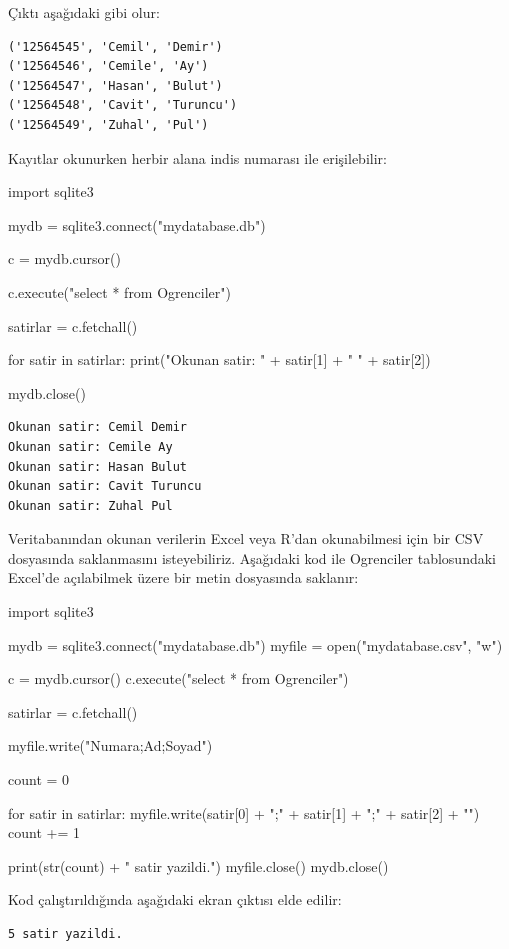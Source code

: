 \documentclass[12pt]{report}
\begin{document}
Çıktı aşağıdaki gibi olur:

\begin{verbatim}
('12564545', 'Cemil', 'Demir')
('12564546', 'Cemile', 'Ay')
('12564547', 'Hasan', 'Bulut')
('12564548', 'Cavit', 'Turuncu')
('12564549', 'Zuhal', 'Pul')
\end{verbatim}

Kayıtlar okunurken herbir alana indis numarası ile erişilebilir:


\begin{python}
import sqlite3

mydb = sqlite3.connect("mydatabase.db")

c = mydb.cursor()

c.execute("select * from Ogrenciler")

satirlar = c.fetchall()

for satir in satirlar:
	print("Okunan satir: " + satir[1] + " " + satir[2])

mydb.close()
\end{python}

\begin{verbatim}
Okunan satir: Cemil Demir
Okunan satir: Cemile Ay
Okunan satir: Hasan Bulut
Okunan satir: Cavit Turuncu
Okunan satir: Zuhal Pul
\end{verbatim}


Veritabanından okunan verilerin Excel veya R'dan okunabilmesi için bir CSV dosyasında saklanmasını isteyebiliriz. Aşağıdaki kod ile Ogrenciler tablosundaki Excel'de açılabilmek üzere bir metin dosyasında saklanır:

\begin{python}
import sqlite3

mydb = sqlite3.connect("mydatabase.db")
myfile = open("mydatabase.csv", "w")

c = mydb.cursor()
c.execute("select * from Ogrenciler")

satirlar = c.fetchall()

myfile.write("Numara;Ad;Soyad\n")

count = 0

for satir in satirlar:	
	myfile.write(satir[0] + ";" + satir[1] + ";" + satir[2] + "\n")
	count += 1

print(str(count) + " satir yazildi.")
myfile.close()
mydb.close()
\end{python}


Kod çalıştırıldığında aşağıdaki ekran çıktısı elde edilir:

\begin{verbatim}
5 satir yazildi.
\end{verbatim}
\end{document}
